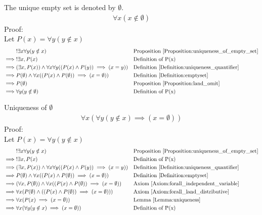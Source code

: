 \begin{defn}
\label{Definition:emptyset}
The unique empty set is denoted by $\emptyset$. \\
\begin{align*}
\forall x (x \notin \emptyset)
\end{align*}
Proof: \\
Let $P(x) = \forall y (y \notin x)$
\begin{align*}
& !\exists x \forall y (y \notin x) && \text{Proposition \ref{Proposition:uniqueness_of_empty_set}} \\
\implies & !\exists x, P(x)
&& \text{Definition of P(x)} \\
\implies & (\exists x, P(x)) \land \forall x \forall y ( (P(x) \land P(y)) \implies (x=y) )
&& \text{Definition \ref{Definition:uniqueness_quantifier}} \\
\implies & P(\emptyset) \land \forall x ( (P(x) \land P(\emptyset)) \implies (x=\emptyset) )
&& \text{Definition \ref{Definition:emptyset}} \\
\implies & P(\emptyset)
&& \text{Proposition \ref{Proposition:land_omit}} \\
\implies & \forall y (y \notin \emptyset)
&& \text{Definition of P(x)} \\
\end{align*}
\end{defn}

\begin{prop}
\label{Proposition:uniqueness_of_emptyset}
Uniqueness of $\emptyset$
\begin{align*}
\forall x (\forall y (y \notin x) \implies (x=\emptyset))
\end{align*}
Proof: \\
Let $P(x) = \forall y (y \notin x)$
\begin{align*}
& !\exists x \forall y (y \notin x) && \text{Proposition \ref{Proposition:uniqueness_of_empty_set}} \\
\implies & !\exists x, P(x)
&& \text{Definition of P(x)} \\
\implies & (\exists x, P(x)) \land \forall x \forall y ( (P(x) \land P(y)) \implies (x=y) )
&& \text{Definition \ref{Definition:uniqueness_quantifier}} \\
\implies & P(\emptyset) \land \forall x ( (P(x) \land P(\emptyset)) \implies (x=\emptyset) )
&& \text{Definition \ref{Definition:emptyset}} \\
\implies & (\forall x, P(\emptyset)) \land \forall x ( (P(x) \land P(\emptyset)) \implies (x=\emptyset) )
&& \text{Axiom \ref{Axiom:forall_independent_variable}} \\
\implies & \forall x ( P(\emptyset) \land ((P(x) \land P(\emptyset)) \implies (x=\emptyset)) )
&& \text{Axiom \ref{Axiom:forall_land_distributive}} \\
\implies & \forall x (P(x) \implies (x=\emptyset))
&& \text{Lemma \ref{Lemma:uniqueness}} \\
\implies & \forall x (\forall y (y \notin x) \implies (x=\emptyset))
&& \text{Definition of P(x)} \\
\end{align*}
\end{prop}


